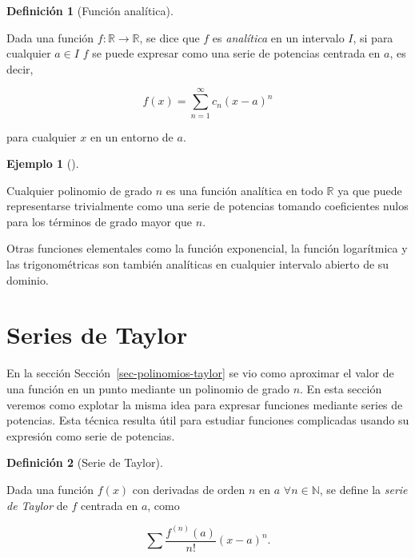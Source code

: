 \documentclass[
  a4paper,
]{scrreport}
\theoremstyle{definition}
\newtheorem{example}{Ejemplo}[chapter]
\theoremstyle{plain}
\theoremstyle{definition}
\newtheorem{definition}{Definición}[chapter]
\theoremstyle{definition}
\theoremstyle{plain}
\theoremstyle{plain}
\theoremstyle{remark}
\begin{document}
\begin{definition}[Función
analítica]\protect\hypertarget{def-funcion-analitica}{}\label{def-funcion-analitica}

Dada una función \(f:\mathbb{R}\to\mathbb{R}\), se dice que \(f\) es
\emph{analítica} en un intervalo \(I\), si para cualquier \(a\in I\)
\(f\) se puede expresar como una serie de potencias centrada en \(a\),
es decir,

\[ f(x) = \sum_{n=1}^\infty c_n(x-a)^n\]

para cualquier \(x\) en un entorno de \(a\).

\end{definition}

\begin{example}[]\protect\hypertarget{exm-funciones-analiticas}{}\label{exm-funciones-analiticas}

Cualquier polinomio de grado \(n\) es una función analítica en todo
\(\mathbb{R}\) ya que puede representarse trivialmente como una serie de
potencias tomando coeficientes nulos para los términos de grado mayor
que \(n\).

Otras funciones elementales como la función exponencial, la función
logarítmica y las trigonométricas son también analíticas en cualquier
intervalo abierto de su dominio.

\end{example}

\section{Series de Taylor}\label{series-de-taylor}

En la sección Sección~\ref{sec-polinomios-taylor} se vio como aproximar
el valor de una función en un punto mediante un polinomio de grado
\(n\). En esta sección veremos como explotar la misma idea para expresar
funciones mediante series de potencias. Esta técnica resulta útil para
estudiar funciones complicadas usando su expresión como serie de
potencias.

\begin{definition}[Serie de
Taylor]\protect\hypertarget{def-serie-taylor}{}\label{def-serie-taylor}

Dada una función \(f(x)\) con derivadas de orden \(n\) en \(a\)
\(\forall n\in\mathbb{N}\), se define la \emph{serie de Taylor} de \(f\)
centrada en \(a\), como

\[
\sum \frac{f^{(n)}(a)}{n!}(x-a)^n.
\]

\end{definition}
\end{document}
